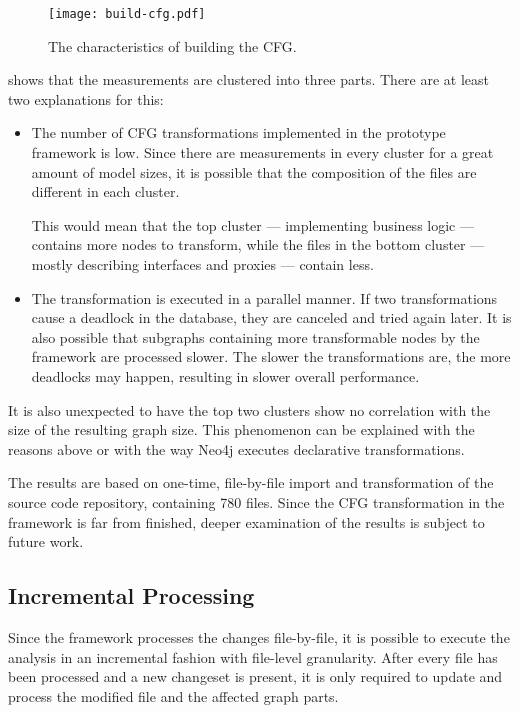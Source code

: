 \begin{figure}[!htb]
  \centering
  \texttt{[image: build-cfg.pdf]}
  \caption{The characteristics of building the CFG.}
  \label{fig:build-cfg}
\end{figure}

 shows that the measurements are clustered into three parts. There are at least two explanations for this:

\begin{itemize}[topsep=0pt]
  \item The number of CFG transformations implemented in the prototype framework is low. Since there are measurements in every cluster for a great amount of model sizes, it is possible that the composition of the files are different in each cluster.

  This would mean that the top cluster --- implementing business logic --- contains more nodes to transform, while the files in the bottom cluster --- mostly describing interfaces and proxies --- contain less.

  \item The transformation is executed in a parallel manner. If two transformations cause a deadlock in the database, they are canceled and tried again later. It is also possible that subgraphs containing more transformable nodes by the framework are processed slower. The slower the transformations are, the more deadlocks may happen, resulting in slower overall performance.
\end{itemize}

It is also unexpected to have the top two clusters show no correlation with the size of the resulting graph size. This phenomenon can be explained with the reasons above or with the way Neo4j executes declarative transformations.

The results are based on one-time, file-by-file import and transformation of the source code repository, containing 780 files. Since the CFG transformation in the framework is far from finished, deeper examination of the results is subject to future work.

\subsection{Incremental Processing}
Since the framework processes the changes file-by-file, it is possible to execute the analysis in an incremental fashion with file-level granularity. After every file has been processed and a new changeset is present, it is only required to update and process the modified file and the affected graph parts.

